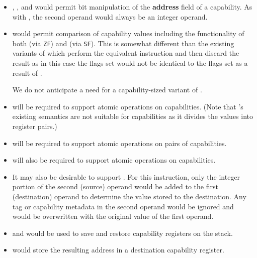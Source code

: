 \begin{itemize}
  \item {}, , and  would
    permit bit manipulation of the \textbf{address} field of a capability.  As
    with , the second operand would always be an
    integer operand.

  \item {} would permit comparison of capability values
    including the functionality of both  (via
    \texttt{ZF}) and  (via \texttt{SF}).  This is
    somewhat different than the existing variants of 
    which perform the equivalent  instruction and then
    discard the result as in this case the flags set would not be
    identical to the flags set as a result of .

    We do not anticipate a need for a capability-sized variant of
    .

  \item {} will be required to support atomic
    operations on capabilities.  (Note that 's
    existing semantics are not suitable for capabilities as it divides
    the values into register pairs.)

  \item {} will be required to support atomic
    operations on pairs of capabilities.

  \item {} will also be required to support atomic
    operations on capabilities.

  \item It may also be desirable to support .  For
    this instruction, only the integer portion of the second (source)
    operand would be added to the first
    (destination) operand to determine the value stored to the
    destination.  Any tag or capability metadata in the second operand
    would be ignored and would be overwritten with the original value
    of the first operand.

  \item {} and  would be used to save
    and restore capability registers on the stack.

  \item {} would store the resulting address in a
    destination capability register.


\end{itemize}
